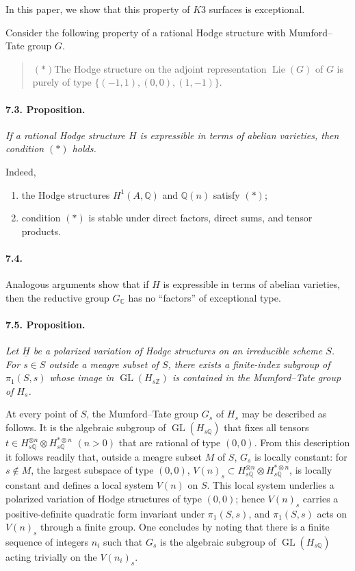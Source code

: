 \documentclass[10pt,leqno]{article}
\newcommand{\C}{\mathbb{C}}
\newcommand{\Q}{\mathbb{Q}}
\newcommand{\Z}{\mathbb{Z}}
\newcommand{\Lie}{\operatorname{Lie}}
\newcommand{\GL}{\operatorname{GL}}
\begin{document}
In this paper, we show that this property of $K3$ surfaces is exceptional.

Consider the following property of a rational Hodge structure with Mumford--Tate group $G$.
\begin{quote}
\raggedright\noindent $(*)$\quad The Hodge structure on the adjoint representation $\Lie(G)$ of $G$ is purely of type $\{(-1,1),(0,0),(1,-1)\}$.
\end{quote}

\paragraph{7.3. Proposition.} \emph{If a rational Hodge structure $H$ is expressible in terms of abelian varieties, then condition $(*)$ holds.}

Indeed,
\begin{enumerate}[label=(\alph*)]
\item the Hodge structures $H^1(A,\Q)$ and $\Q(n)$ satisfy $(*)$;
\item condition $(*)$ is stable under direct factors, direct sums, and tensor products.
\end{enumerate}

\clearpage

\paragraph{7.4.} Analogous arguments show that if $H$ is expressible in terms of abelian varieties, then the reductive group $G_\C$ has no ``factors'' of exceptional type.

\paragraph{7.5. Proposition.} \emph{Let $\underline H$ be a polarized variation of Hodge structures on an irreducible scheme $S$. For $s\in S$ outside a meagre subset of $S$, there exists a finite-index subgroup of $\pi_1(S,s)$ whose image in $\GL(H_{s\Z})$ is contained in the Mumford--Tate group of $H_s$.}

At every point of $S$, the Mumford--Tate group $G_s$ of $H_s$ may be described as follows. It is the algebraic subgroup of $\GL(H_{s\Q})$ that fixes all tensors $t\in H_{s\Q}^{\otimes n}\otimes H_{s\Q}^{*\otimes n}$ $(n>0)$ that are rational of type $(0,0)$. From this description it follows readily that, outside a meagre subset $M$ of $S$, $G_s$ is locally constant: for $s\notin M$, the largest subspace of type $(0,0)$, $V(n)_s\subset H_{s\Q}^{\otimes n}\otimes H_{s\Q}^{*\otimes n}$, is locally constant and defines a local system $V(n)$ on $S$. This local system underlies a polarized variation of Hodge structures of type $(0,0)$; hence $V(n)_s$ carries a positive-definite quadratic form invariant under $\pi_1(S,s)$, and $\pi_1(S,s)$ acts on $V(n)_s$ through a finite group. One concludes by noting that there is a finite sequence of integers $n_i$ such that $G_s$ is the algebraic subgroup of $\GL(H_{s\Q})$ acting trivially on the $V(n_i)_s$.
\end{document}
